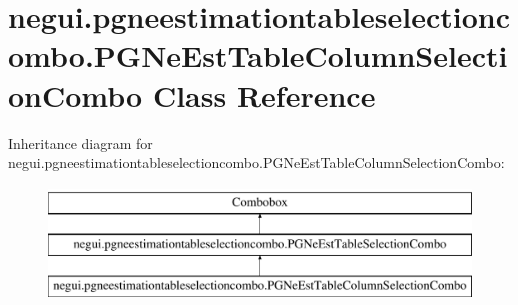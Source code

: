 \hypertarget{classnegui_1_1pgneestimationtableselectioncombo_1_1PGNeEstTableColumnSelectionCombo}{}\section{negui.\+pgneestimationtableselectioncombo.\+P\+G\+Ne\+Est\+Table\+Column\+Selection\+Combo Class Reference}
\label{classnegui_1_1pgneestimationtableselectioncombo_1_1PGNeEstTableColumnSelectionCombo}
Inheritance diagram for negui.\+pgneestimationtableselectioncombo.\+P\+G\+Ne\+Est\+Table\+Column\+Selection\+Combo\+:\begin{figure}[H]
\begin{center}
\leavevmode
\includegraphics[height=3.000000cm]{classnegui_1_1pgneestimationtableselectioncombo_1_1PGNeEstTableColumnSelectionCombo}
\end{center}
\end{figure}
